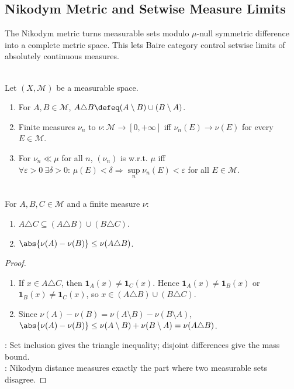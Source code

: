 \subsection{Nikodym Metric and Setwise Measure Limits}

The Nikodym metric turns measurable sets modulo $\mu$-null symmetric difference into a complete metric space. This lets Baire category control setwise limits of absolutely continuous measures.

\begin{definition} \label{def:setwise-convergence-and-uniform-absolute-continuity} \\
Let $(X,\mathcal{M})$ be a measurable space.
\begin{enumerate}[label=(\roman*)]
\setlength{\itemsep}{0pt}
\item For $A,B\in\mathcal{M}$, $A\triangle B\defeq(A\setminus B)\cup(B\setminus A)$.
\item Finite measures $\nu_n$  to $\nu:\mathcal{M}\to[0,+\infty]$ iff $\nu_n(E)\to\nu(E)$ for every $E\in\mathcal{M}$.
\item For $\nu_n\ll\mu$ for all $n$, $(\nu_n)$ is  w.r.t. $\mu$ iff\\
$\forall\varepsilon>0\ \exists\delta>0$: $\mu(E)<\delta\Rightarrow\sup\limits_n\nu_n(E)<\varepsilon$ for all $E\in\mathcal{M}$.
\end{enumerate}
\end{definition}

\begin{lemma} \label{lem:nikodym-symmetric-difference-calculus} \\
For $A,B,C\in\mathcal{M}$ and a finite measure $\nu$:
\begin{enumerate}[label=(\roman*)]
\setlength{\itemsep}{0pt}
\item $A\triangle C\subseteq(A\triangle B)\cup(B\triangle C)$.
\item $\abs{\nu(A)-\nu(B)}\leq\nu(A\triangle B)$.
\end{enumerate}
\begin{proof}
\begin{enumerate}[label=(\roman*)]
\setlength{\itemsep}{0pt}
\item If $x\in A\triangle C$, then $\mathbf{1}_A(x)\neq\mathbf{1}_C(x)$. Hence $\mathbf{1}_A(x)\neq\mathbf{1}_B(x)$ or $\mathbf{1}_B(x)\neq\mathbf{1}_C(x)$, so $x\in(A\triangle B)\cup(B\triangle C)$.
\item Since $\nu(A)-\nu(B)=\nu(A\setminus B)-\nu(B\setminus A)$, $\abs{\nu(A)-\nu(B)}\leq\nu(A\setminus B)+\nu(B\setminus A)=\nu(A\triangle B)$.
\end{enumerate}
: Set inclusion gives the triangle inequality; disjoint differences give the mass bound.\\
: Nikodym distance measures exactly the part where two measurable sets disagree.
\end{proof}
\end{lemma}

